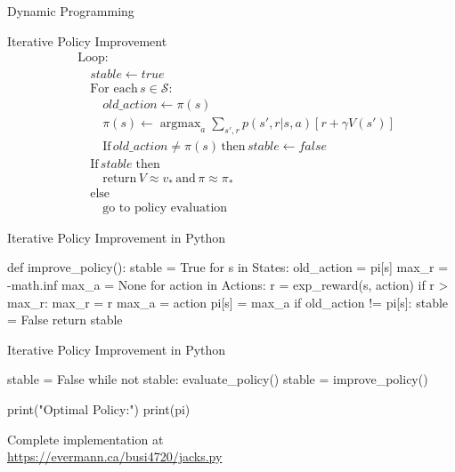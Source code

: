 \documentclass[ignorenonframetext,xcolor=x11names]{beamer}
\begin{document}
\begin{frame}[label=full]{Dynamic Programming}
\begin{block}{Iterative Policy Improvement}
\begin{align*}
&\text{Loop:} \\
&\quad stable \leftarrow true \\
&\quad \text{For each}\, s \in \mathcal{S}: \\
&\quad \quad old\_action \leftarrow \pi(s) \\
&\quad \quad \pi (s) \leftarrow \operatorname*{argmax}\nolimits_a \sum\nolimits_{s', r} p(s', r|s, a) [r + \gamma V(s')] \\
&\quad \quad \text{If}\, old\_action \neq \pi(s) \, \text{then} \, stable \leftarrow false \\
&\quad \text{If}\, stable \; \text{then} \\
&\quad \quad \text{return}\, V \approx v_*\, \text{and} \, \pi \approx \pi_* \\
&\quad \text{else} \\
&\quad \quad \text{go to policy evaluation}
\end{align*}
\end{block}
\end{frame}

\begin{frame}[label=withcode,fragile]{Iterative Policy Improvement in Python}
\begin{pythoncode}
def improve_policy():
    stable = True
    for s in States:
        old_action = pi[s]
        max_r = -math.inf
        max_a = None
        for action in Actions:
            r = exp_reward(s, action)
            if r > max_r:
                max_r = r
                max_a = action
        pi[s] = max_a
        if old_action != pi[s]:
            stable = False
    return stable
\end{pythoncode}
\end{frame}

\begin{frame}[label=withcode,fragile]{Iterative Policy Improvement in Python}
\begin{pythoncode}
stable = False
while not stable:
    evaluate_policy()
    stable = improve_policy()

print("Optimal Policy:")
print(pi)
\end{pythoncode}
\begin{center}
Complete implementation at \\
\vspace{\baselineskip}
\url{https://evermann.ca/busi4720/jacks.py}
\end{center}
\end{frame}
\end{document}
